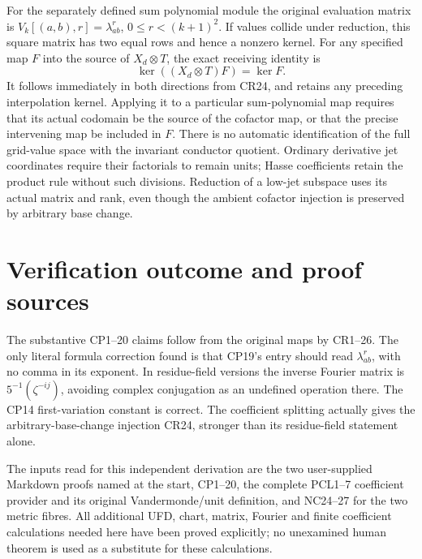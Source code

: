 \documentclass[11pt]{article}
\begin{document}
For the separately defined sum polynomial module the original
evaluation matrix is
$V_k[(a,b),r]=\lambda_{ab}^{r}$, $0\le r<(k+1)^2$.
If values collide under reduction, this square matrix has two
equal rows and hence a nonzero kernel.  For any specified map
$F$ into the source of $X_d\otimes T$, the exact receiving
identity is
\[
 \ker((X_d\otimes T)F)=\ker F.                                \tag{CR26}
\]
It follows immediately in both directions from CR24, and retains
any preceding interpolation kernel.  Applying it to a particular
sum-polynomial map requires that its actual codomain be the
source of the cofactor map, or that the precise intervening map
be included in $F$.  There is no automatic identification of
the full grid-value space with the invariant conductor quotient.
Ordinary derivative jet coordinates require their factorials
to remain units; Hasse coefficients retain the product rule
without such divisions.  Reduction of a low-jet subspace uses
its actual matrix and rank, even though the ambient cofactor
injection is preserved by arbitrary base change.

\section{Verification outcome and proof sources}
The substantive CP1--20 claims follow from the original maps by
CR1--26.  The only literal formula correction found is that CP19's
entry should read $\lambda_{ab}^{r}$, with no comma in its exponent.
In residue-field versions the inverse Fourier matrix is
$5^{-1}(\zeta^{-ij})$, avoiding complex conjugation as an undefined
operation there.  The CP14 first-variation constant is correct.
The coefficient splitting actually gives the arbitrary-base-change
injection CR24, stronger than its residue-field statement alone.

The inputs read for this independent derivation are the two
user-supplied Markdown proofs named at the start, CP1--20,
the complete PCL1--7 coefficient provider and its original
Vandermonde/unit definition, and NC24--27 for the two metric
fibres.  All additional UFD, chart, matrix, Fourier and finite
coefficient calculations needed here have been proved explicitly;
no unexamined human theorem is used as a substitute for these
calculations.
\end{document}
